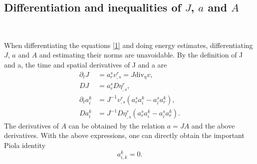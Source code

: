 \documentclass[12pt,a4paper]{amsart}
\numberwithin{equation}{section}
\theoremstyle{plain}
\theoremstyle{definition}
\newcommand{\dv}{\mathrm{div}}
\begin{document}
\vspace{0.3cm}
\subsection{Differentiation and inequalities of $J$, $a$ and $A$}~

When differentiating the equations \eqref{1} and doing energy estimates, differentiating $J$,
$a$ and $A$ and estimating their norms are unavoidable.
By the definition of J and a, the time and spatial derivatives of J and a are
\begin{equation}\label{deri_Ja}
\begin{aligned}
\partial_t J&=a^s_r v^r_{,s}=J\dv_{\eta} v,\\
D J&=a^s_r D\eta^r_{,s},\\
\partial_t a^k_i&=J^{-1}v^r_{,s}(a^s_ra^k_i-a^s_ia^k_r),\\
D a^k_i&=J^{-1}D\eta^r_{,s}(a^s_ra^k_i-a^s_ia^k_r).
\end{aligned}
\end{equation}
The derivatives of $A$ can be obtained by the relation $a = JA$ and the above derivatives.
With the above expressions, one can directly obtain the important Piola identity
\begin{equation}
a^k_{i,k}=0.
\end{equation}



\end{document}
